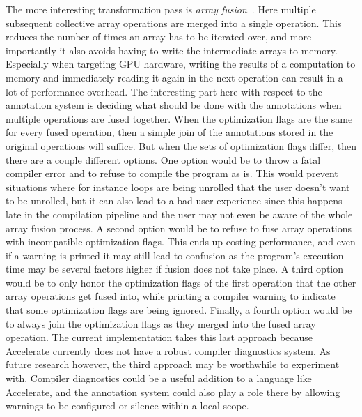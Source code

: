 \documentclass[fontsize=11pt,a4paper,parskip=half,numbers=noenddot]{scrartcl}
\begin{document}
The more interesting transformation pass is \emph{array
  fusion}~\cite{chakravarty2001functional}. Here multiple subsequent collective
array operations are merged into a single operation. This reduces the number of
times an array has to be iterated over, and more importantly it also avoids
having to write the intermediate arrays to memory. Especially when targeting GPU
hardware, writing the results of a computation to memory and immediately reading
it again in the next operation can result in a lot of performance overhead. The
interesting part here with respect to the annotation system is deciding what
should be done with the annotations when multiple operations are fused together.
When the optimization flags are the same for every fused operation, then a
simple join of the annotations stored in the original operations will suffice.
But when the sets of optimization flags differ, then there are a couple
different options. One option would be to throw a fatal compiler error and to
refuse to compile the program as is. This would prevent situations where for
instance loops are being unrolled that the user doesn't want to be unrolled, but
it can also lead to a bad user experience since this happens late in the
compilation pipeline and the user may not even be aware of the whole array
fusion process. A second option would be to refuse to fuse %
array operations with incompatible optimization flags. This ends up costing
performance, and even if a warning is printed it may still lead to confusion as
the program's execution time may be several factors higher if fusion does not
take place. A third option would be to only honor the optimization flags of the
first operation that the other array operations get fused into, while printing a
compiler warning to indicate that some optimization flags are being ignored.
Finally, a fourth option would be to always join the optimization flags as they
merged into the fused array operation. The current implementation takes this
last approach because Accelerate currently does not have a robust compiler
diagnostics system. As future research however, the third approach may be
worthwhile to experiment with. Compiler diagnostics could be a useful addition
to a language like Accelerate, and the annotation system could also play a role
there by allowing warnings to be configured or silence within a local scope.

\end{document}
